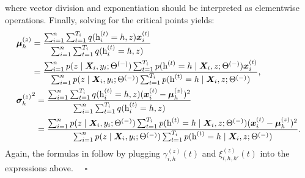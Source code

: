 where vector division and exponentiation should be interpreted as elementwise operations. Finally, solving for the critical points yields:
\begin{align}
&\vmu^{(z)}_h = \frac{\sum_{i=1}^n  \sum_{t=1}^{T_i} q(\rh^{(t)}_i=h, z) \vx^{(t)}_i}{\sum_{i=1}^n  \sum_{t=1}^{T_i} q(\rh^{(t)}_i=h, z)} \nonumber\\
&\hphantom{\vmu^{(z)}_h} = \frac{\sum_{i=1}^n p(z \mid \mX_i, y_i; \Theta^{(-)}) \sum_{t=1}^{T_i} p(\rh^{(t)}=h \mid \mX_i, z; \Theta^{(-)}) \vx^{(t)}_i}{\sum_{i=1}^n p(z \mid \mX_i, y_i; \Theta^{(-)}) \sum_{t=1}^{T_i} p(\rh^{(t)}=h \mid \mX_i, z; \Theta^{(-)})}, \\
&{\vsigma^{(z)}_h}^2 = \frac{\sum_{i=1}^n  \sum_{t=1}^{T_i} q(\rh^{(t)}_i=h, z) (\vx^{(t)}_i - \vmu^{(z)}_h)^2}{\sum_{i=1}^n  \sum_{t=1}^{T_i} q(\rh^{(t)}_i=h, z)} \nonumber\\
&\hphantom{{\vsigma^{(z)}_h}^2} = \frac{\sum_{i=1}^n p(z \mid \mX_i, y_i; \Theta^{(-)}) \sum_{t=1}^{T_i} p(\rh^{(t)}=h \mid \mX_i, z; \Theta^{(-)}) (\vx^{(t)}_i - \vmu^{(z)}_h)^2}{\sum_{i=1}^n p(z \mid \mX_i, y_i; \Theta^{(-)}) \sum_{t=1}^{T_i} p(\rh^{(t)}=h \mid \mX_i, z; \Theta^{(-)})}.
\end{align}
Again, the formulas in  follow by plugging $\gamma^{(z)}_{i,h}(t)$ and $\xi^{(z)}_{i,h,h'}(t)$ into the expressions above. $\quad \square$

